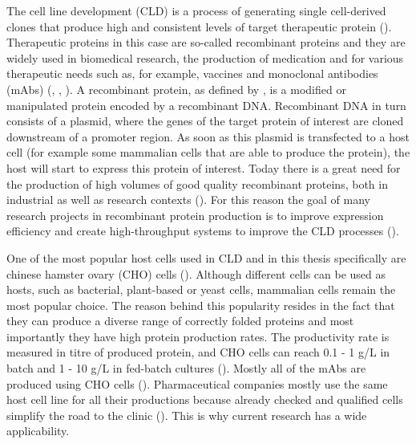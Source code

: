 The cell line development (CLD) is a process of generating single cell-derived clones that produce high and consistent levels of target therapeutic protein (\cite{lonza}). Therapeutic proteins in this case are so-called recombinant proteins and they are widely used in biomedical research, the production of medication and for various therapeutic needs such as, for example, vaccines and monoclonal antibodies (mAbs) (\cite{Ohtake_2013}, \cite{Jefferis_2017}, \cite{Funaro_1996}). A recombinant protein, as defined by \cite{Barbeau_2018}, is a modified or manipulated protein encoded by a recombinant DNA. Recombinant DNA in turn consists of a plasmid, where the genes of the target protein of interest are cloned downstream of a promoter region. As soon as this plasmid is transfected to a host cell (for example some mammalian cells that are able to produce the protein), the host will start to express this protein of interest. Today there is a great need for the production of high volumes of good quality recombinant proteins, both in industrial as well as research contexts (\cite{Tihanyi_2020}). For this reason the goal of many research projects in recombinant protein production is to improve expression efficiency and create high-throughput systems to improve the CLD processes (\cite{Tihanyi_2020}).



One of the most popular host cells used in CLD and in this thesis specifically are chinese hamster ovary (CHO) cells (\cite{Castan_2018}). Although different cells can be used as hosts, such as bacterial, plant-based or yeast cells, mammalian cells remain the most popular choice. The reason behind this popularity resides in the fact that they can produce a diverse range of correctly folded proteins and most importantly they have high protein production rates. The productivity rate is measured in titre of produced protein, and CHO cells can reach 0.1 - 1 g/L in batch and 1 - 10 g/L in fed-batch cultures (\cite{Tihanyi_2020}). Mostly all of the mAbs are produced using CHO cells (\cite{Lalonde_2017}). Pharmaceutical companies mostly use the same host cell line for all their productions because already checked and qualified cells simplify the road to the clinic (\cite{Tihanyi_2020}). This is why current research has a wide applicability.

